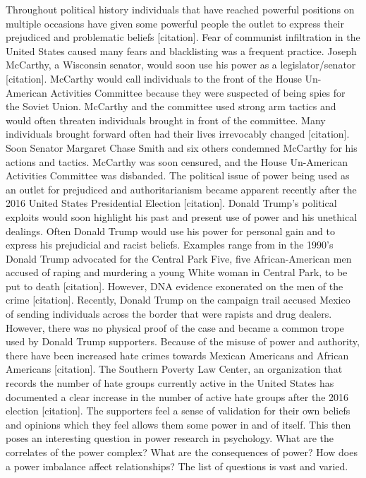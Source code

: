 \documentclass[
  english,
  donotrepeattitle,doc, 12pt, a4paper,floatsintext]{apa7}
\begin{document}
Throughout political history individuals that have reached powerful positions on multiple occasions have given some powerful people the outlet to express their prejudiced and problematic beliefs {[}citation{]}. Fear of communist infiltration in the United States caused many fears and blacklisting was a frequent practice. Joseph McCarthy, a Wisconsin senator, would soon use his power as a legislator/senator {[}citation{]}. McCarthy would call individuals to the front of the House Un-American Activities Committee because they were suspected of being spies for the Soviet Union. McCarthy and the committee used strong arm tactics and would often threaten individuals brought in front of the committee. Many individuals brought forward often had their lives irrevocably changed {[}citation{]}. Soon Senator Margaret Chase Smith and six others condemned McCarthy for his actions and tactics. McCarthy was soon censured, and the House Un-American Activities Committee was disbanded. The political issue of power being used as an outlet for prejudiced and authoritarianism became apparent recently after the 2016 United States Presidential Election {[}citation{]}. Donald Trump's political exploits would soon highlight his past and present use of power and his unethical dealings. Often Donald Trump would use his power for personal gain and to express his prejudicial and racist beliefs. Examples range from in the 1990's Donald Trump advocated for the Central Park Five, five African-American men accused of raping and murdering a young White woman in Central Park, to be put to death {[}citation{]}. However, DNA evidence exonerated on the men of the crime {[}citation{]}. Recently, Donald Trump on the campaign trail accused Mexico of sending individuals across the border that were rapists and drug dealers. However, there was no physical proof of the case and became a common trope used by Donald Trump supporters. Because of the misuse of power and authority, there have been increased hate crimes towards Mexican Americans and African Americans {[}citation{]}. The Southern Poverty Law Center, an organization that records the number of hate groups currently active in the United States has documented a clear increase in the number of active hate groups after the 2016 election {[}citation{]}. The supporters feel a sense of validation for their own beliefs and opinions which they feel allows them some power in and of itself. This then poses an interesting question in power research in psychology. What are the correlates of the power complex? What are the consequences of power? How does a power imbalance affect relationships? The list of questions is vast and varied.
\end{document}
